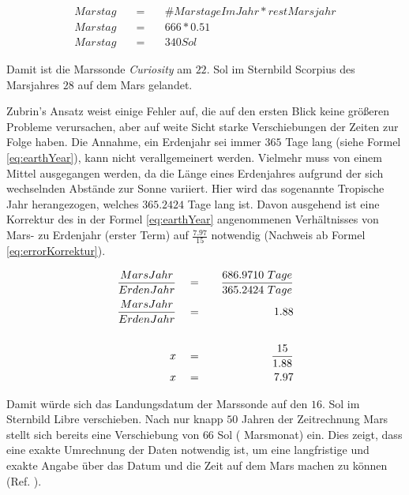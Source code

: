 \begin{eqnarray}
	Marstag \quad & = & \quad \#MarstageImJahr * restMarsjahr \\
	Marstag \quad & = & \quad 666 * 0.51 \\
	Marstag \quad & = & \quad 340 Sol 
	\label{eq:MarsMonthSol}
\end{eqnarray}

Damit ist die Marssonde \textit{Curiosity} am $22.$ Sol im Sternbild Scorpius
des Marsjahres $28$ auf dem Mars gelandet.

Zubrin's Ansatz weist einige Fehler auf, die auf den ersten Blick keine
gr{\"o}{\ss}eren Probleme verursachen, aber auf weite Sicht starke
Verschiebungen der Zeiten zur Folge haben. Die Annahme, ein Erdenjahr sei immer $365$ Tage lang (siehe Formel
\ref{eq:earthYear}), kann nicht verallgemeinert werden. Vielmehr muss von einem
Mittel ausgegangen werden, da die L{\"a}nge eines Erdenjahres aufgrund der sich
wechselnden Abst{\"a}nde zur Sonne variiert. Hier wird das sogenannte Tropische Jahr
herangezogen, welches $365.2424$ Tage lang ist. Davon ausgehend ist eine
Korrektur des in der Formel \ref{eq:earthYear} angenommenen Verh{\"a}ltnisses von
Mars- zu Erdenjahr (erster Term) auf $\frac{7.97}{15}$ notwendig (Nachweis ab
Formel \ref{eq:errorKorrektur}).

\begin{eqnarray}
	\frac{MarsJahr}{ErdenJahr} \quad & = & \quad \frac{686.9710 \ Tage}{365.2424 \
	Tage}
	\\
	\label{eq:errorKorrektur}  
	\frac{MarsJahr}{ErdenJahr} \quad & = & \quad 1.88 \\
	\notag\\
	x \quad & = & \quad \frac{15}{1.88} \\
	x \quad & = & \quad 7.97 
\end{eqnarray}

Damit w{\"u}rde sich das Landungsdatum der Marssonde auf den $16.$ Sol im Sternbild
Libre verschieben. Nach nur knapp $50$ Jahren der Zeitrechnung Mars stellt sich
bereits eine Verschiebung von $66$ Sol (\ca 1 Marsmonat) ein. Dies zeigt, dass
eine exakte Umrechnung der Daten notwendig ist, um eine langfristige und exakte
Angabe {\"u}ber das Datum und die Zeit auf dem Mars machen zu k{\"o}nnen (Ref.
\cite{web10}).
